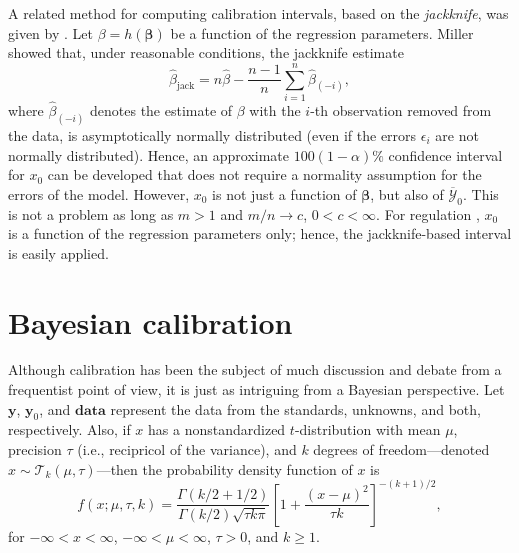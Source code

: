 \documentclass[cmfont,usenames,dvipsnames,leqno]{afit-etd}\usepackage[]{graphicx}\usepackage[]{color}
\newcommand{\mc}[1]{\ensuremath{\mathcal{#1}}}
\newcommand{\wh}[1]{\ensuremath{\widehat{#1}}}
\newcommand{\wb}[1]{\ensuremath{\overline{#1}}}
\begin{document}
A related method for computing calibration intervals, based on the \textit{jackknife}, was given by \citet{miller_unbalanced_1974}. Let $\beta = h(\bm{\beta})$ be a function of the regression parameters. Miller showed that, under reasonable conditions, the jackknife estimate
\begin{equation*}
  \wh{\beta}_\text{jack} = n\wh{\beta} - \frac{n-1}{n}\sum_{i=1}^n\wh{\beta}_{(-i)},
\end{equation*}
where $\wh{\beta}_{(-i)}$ denotes the estimate of $\beta$ with the $i$-th observation removed from the data, is asymptotically normally distributed (even if the errors $\epsilon_i$ are not normally distributed). Hence, an approximate $100(1-\alpha)\%$ confidence interval for $x_0$ can be developed that does not require a normality assumption for the errors of the model. However, $x_0$ is not just a function of $\bm{\beta}$, but also of $\wb{\mc{Y}}_0$. This is not a problem as long as $m > 1$ and $m/n \rightarrow c$, $0 < c < \infty$. For regulation \citep[pp. 431-432]{graybill_regression_1994}, $x_0$ is a function of the regression parameters only; hence, the jackknife-based interval is easily applied.

\section{Bayesian calibration}
\label{sec:bayesian}
Although calibration has been the subject of much discussion and debate from a frequentist point of view, it is just as intriguing from a Bayesian perspective. Let $\bm{y}$, $\bm{y}_0$, and $\mathbf{data}$ represent the data from the standards, unknowns, and both, respectively. Also, if $x$ has a nonstandardized $t$-distribution with mean $\mu$, precision $\tau$ (i.e., recipricol of the variance), and $k$ degrees of freedom---denoted $x \sim \mathcal{T}_k(\mu, \tau)$---then the probability density function of $x$ is
\begin{equation*}
  f(x;\mu, \tau, k) = \frac{\Gamma{(k/2+1/2)}}{\Gamma{(k/2)}\sqrt{\tau k \pi}}\left[ 1 + \frac{(x-\mu)^2}{\tau k} \right]^{-(k+1)/2},
\end{equation*}
for $-\infty < x < \infty$, $-\infty < \mu < \infty$, $\tau > 0$, and $k \ge 1$.
\end{document}
